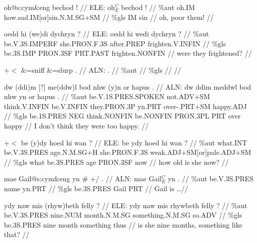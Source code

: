 \documentclass[a4paper,10pt]{article}
\begin{document}
\ex
\begingl[lingstyle=gergl]
\glchat oh@s:cym\&eng bechod ! //
\glsurface ELE:  oh$^{C}_{E}$ bechod !  //
\glauto \%aut  oh{\scriptsize .IM} how{\scriptsize .sad.IM[or]sin.N.M.SG+SM}   //
\glmanual \%gls  IM sin   //
\gleng oh, poor them! //
\endgl
\xe

\ex
\begingl[lingstyle=gergl]
\glchat oedd hi (we)di dychryn ? //
\glsurface ELE:  oedd hi wedi dychryn ?  //
\glauto \%aut  be{\scriptsize .V.3S.IMPERF} she{\scriptsize .PRON.F.3S} after{\scriptsize .PREP} frighten{\scriptsize .V.INFIN}   //
\glmanual \%gls  be{\scriptsize .3S.IMP} PRON{\scriptsize .3SF} PRT{\scriptsize .PAST} frighten{\scriptsize .NONFIN}   //
\gleng were they frightened? //
\endgl
\xe

\ex
\begingl[lingstyle=gergl]
\glchat +$<$ \&=sniff \&=slurp . //
\glsurface ALN:  .  //
\glauto \%aut    //
\glmanual \%gls    //
\gleng  //
\endgl
\xe

\ex
\begingl[lingstyle=gergl]
\glchat dw (ddi)m [?] me(ddw)l bod nhw (y)n or hapus . //
\glsurface ALN:  dw ddim meddwl bod nhw yn or hapus .  //
\glauto \%aut  be{\scriptsize .V.1S.PRES.SPOKEN} not{\scriptsize .ADV+SM} think{\scriptsize .V.INFIN} be{\scriptsize .V.INFIN} they{\scriptsize .PRON.3P} yn{\scriptsize .PRT} over-.PRT+SM happy{\scriptsize .ADJ}   //
\glmanual \%gls  be{\scriptsize .1S.PRES} NEG think{\scriptsize .NONFIN} be{\scriptsize .NONFIN} PRON{\scriptsize .3PL} PRT over happy   //
\gleng I don't think they were too happy. //
\endgl
\xe

\ex
\begingl[lingstyle=gergl]
\glchat +$<$ be (y)dy hoed hi wan ? //
\glsurface ELE:  be ydy hoed hi wan ?  //
\glauto \%aut  what{\scriptsize .INT} be{\scriptsize .V.3S.PRES} age{\scriptsize .N.M.SG+H} she{\scriptsize .PRON.F.3S} weak{\scriptsize .ADJ+SM[or]pale.ADJ+SM}   //
\glmanual \%gls  what be{\scriptsize .3S.PRES} age PRON{\scriptsize .3SF} now   //
\gleng how old is she now? //
\endgl
\xe

\ex
\begingl[lingstyle=gergl]
\glchat mae Gail@s:cym\&eng yn \# +/ . //
\glsurface ALN:  mae Gail$^{C}_{E}$ yn .  //
\glauto \%aut  be{\scriptsize .V.3S.PRES} name yn{\scriptsize .PRT}   //
\glmanual \%gls  be{\scriptsize .3S.PRES} Gail PRT   //
\gleng Gail is \dots  //
\endgl
\xe

\ex
\begingl[lingstyle=gergl]
\glchat ydy naw mis (rhyw)beth felly ? //
\glsurface ELE:  ydy naw mis rhywbeth felly ?  //
\glauto \%aut  be{\scriptsize .V.3S.PRES} nine{\scriptsize .NUM} month{\scriptsize .N.M.SG} something{\scriptsize .N.M.SG} so{\scriptsize .ADV}   //
\glmanual \%gls  be{\scriptsize .3S.PRES} nine month something thus   //
\gleng is she nine months, something like that? //
\endgl
\xe
\end{document}
